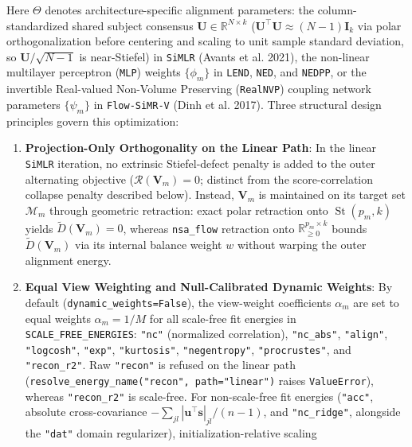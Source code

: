 \documentclass[
  10pt,
  letterpaper,
]{report}
\providecommand{\tightlist}{%
  \setlength{\itemsep}{0pt}\setlength{\parskip}{0pt}}
\begin{document}
Here \(\Theta\) denotes architecture-specific alignment parameters: the
column-standardized shared subject consensus
\(\mathbf{U} \in \mathbb{R}^{N \times k}\)
(\(\mathbf{U}^\top \mathbf{U} \approx (N - 1)\mathbf{I}_k\) via polar
orthogonalization before centering and scaling to unit sample standard
deviation, so \(\mathbf{U}/\sqrt{N - 1}\) is near-Stiefel) in
\texttt{SiMLR} (Avants et al. 2021), the non-linear multilayer
perceptron (\texttt{MLP}) weights \(\{\phi_m\}\) in \texttt{LEND},
\texttt{NED}, and \texttt{NEDPP}, or the invertible Real-valued
Non-Volume Preserving (\texttt{RealNVP}) coupling network parameters
\(\{\psi_m\}\) in \texttt{Flow-SiMR-V} (Dinh et al. 2017). Three
structural design principles govern this optimization:

\begin{enumerate}
\def\labelenumi{\arabic{enumi}.}
\tightlist
\item
  \textbf{Projection-Only Orthogonality on the Linear Path}: In the
  linear \texttt{SiMLR} iteration, no extrinsic Stiefel-defect penalty
  is added to the outer alternating objective
  (\(\mathcal{R}(\mathbf{V}_m) = 0\); distinct from the
  score-correlation collapse penalty described below). Instead,
  \(\mathbf{V}_m\) is maintained on its target set \(\mathcal{M}_m\)
  through geometric retraction: exact polar retraction onto
  \(\operatorname{St}(p_m, k)\) yields \(\tilde{D}(\mathbf{V}_m) = 0\),
  whereas \texttt{nsa\_flow} retraction onto
  \(\mathbb{R}_{\ge 0}^{p_m \times k}\) bounds
  \(\tilde{D}(\mathbf{V}_m)\) via its internal balance weight \(w\)
  without warping the outer alignment energy.
\item
  \textbf{Equal View Weighting and Null-Calibrated Dynamic Weights}: By
  default (\texttt{dynamic\_weights=False}), the view-weight
  coefficients \(\alpha_m\) are set to equal weights \(\alpha_m = 1/M\)
  for all scale-free fit energies in \texttt{SCALE\_FREE\_ENERGIES}:
  \texttt{"nc"} (normalized correlation), \texttt{"nc\_abs"},
  \texttt{"align"}, \texttt{"logcosh"}, \texttt{"exp"},
  \texttt{"kurtosis"}, \texttt{"negentropy"}, \texttt{"procrustes"}, and
  \texttt{"recon\_r2"}. Raw \texttt{"recon"} is refused on the linear
  path (\texttt{resolve\_energy\_name("recon",\ path="linear")} raises
  \texttt{ValueError}), whereas \texttt{"recon\_r2"} is scale-free. For
  non-scale-free fit energies (\texttt{"acc"}, absolute cross-covariance
  \(-\sum_{jl}|\mathbf{u}^\top \mathbf{s}|_{jl}/(n - 1)\), and
  \texttt{"nc\_ridge"}, alongside the \texttt{"dat"} domain
  regularizer), initialization-relative scaling

\end{enumerate}
\end{document}
